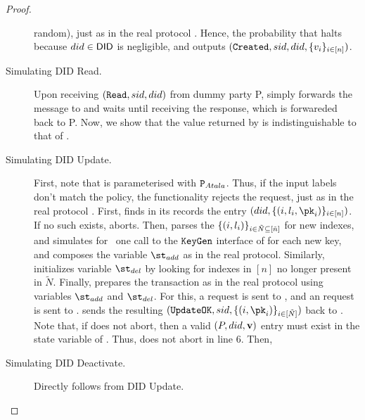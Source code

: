 \begin{proof}
\begin{description}
    random), just as in the real protocol \RealPKIDIDAtala. Hence, the
    probability that \IdealFPKIDID halts because $\did \in \DID$ is negligible,
    and \IdealFPKIDID outputs $(\uccmd{Created},\sid,\did,\lbrace \val_i
    \rbrace_{i\in[n]})$.
  \item[Simulating DID Read.]
    Upon receiving $(\uccmd{Read},\sid,\did)$ from dummy party P, \Sim simply
    forwards the message to \adv and waits until receiving the response, which
    is forwareded back to P.
    Now, we show that the value returned by \IdealFPKIDID is indistinguishable
    to that of \RealPKIDIDAtala. 
  \item[Simulating DID Update.]
    First, note that \IdealFPKIDID is parameterised with $\P_{Atala}$. Thus,
    if the input labels don't match the policy, the functionality rejects the
    request, just as in the real protocol \RealPKIDIDAtala.
    First, \Sim finds in its records the entry $(\did,\lbrace (i,\lbl_i,\pk_i)
    \rbrace_{i\in[n]})$. If no such \did exists, aborts.
    Then, \Sim parses the $\lbrace(i,\lbl_i)\rbrace_{i\in\tilde{N}\subseteq
      [\tilde{n}]}$ for new indexes, and simulates for \adv~one call to the
    $\uccmd{KeyGen}$ interface of \IdealFSig for each new key, and composes the
    variable $\st_{add}$ as in the real protocol. Similarly, \Sim initializes
    variable $\st_{del}$ by looking for indexes in $[n]$ no longer present in
    $\tilde{N}$.
    Finally, \Sim prepares the transaction \tx as in the real protocol using
    variables $\st_{add}$ and $\st_{del}$. For this, a  request is
    sent to \IdealFSig, and an  request is sent to \IdealFaobb.
    \Sim sends the resulting $(\uccmd{UpdateOK},\sid,\lbrace (i,\pk_i)
    \rbrace_{i\in[\tilde{N}]})$ back to \IdealFPKIDID.
    Note that, if \Sim does not abort, then a valid $(P,\did,\sval)$ entry must
    exist in the \DID state variable of \IdealFPKIDID. Thus, \IdealFPKIDID does
    not abort in line 6. Then, \IdealFPKIDID
  \item[Simulating DID Deactivate.] Directly follows from DID Update.      
  \end{description}
\end{proof}


